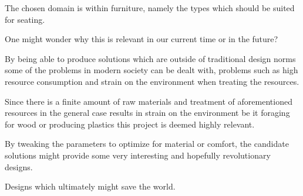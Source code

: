 The chosen domain is within furniture, namely the types which should be suited for seating.

One might wonder why this is relevant in our current time or in the future?

By being able to produce solutions which are outside of traditional design norms some of the problems in modern society can be dealt with, problems such as high resource consumption and strain on the environment when treating the resources.

Since there is a finite amount of raw materials and treatment of aforementioned  resources in the general case results in strain on the environment be it foraging for wood or producing plastics this project is deemed highly relevant.

By tweaking the parameters to optimize for material or comfort, the candidate solutions might provide some very interesting and hopefully revolutionary designs.

Designs which ultimately might save the world.

